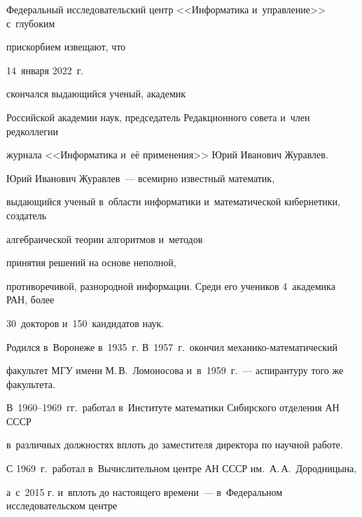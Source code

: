       


      Федеральный исследовательский центр <<Информатика и~управление>> с~глубоким


      прискорбием извещают, что     


      14~января 2022~г.\ %


      скончался выдающийся ученый, академик 


Российской академии наук, председатель Редакционного совета и~член редколлегии 


журнала <<Информатика и~её применения>> Юрий Иванович Журавлев.








      


      Юрий Иванович Журавлев~--- всемирно известный математик, 


выдающийся ученый в~области информатики и~математической кибернетики, создатель 


алгебраической теории алгоритмов и~методов


 принятия решений на основе неполной, 


противоречивой, разнородной информации. Среди его учеников 4~академика РАН, более 


30~докторов и~150~кандидатов наук. 








      


      Родился в~Воронеже в~1935~г. В~1957~г.\ окончил механико-математический 


факультет МГУ имени М.\,В.~Ломоносова и~в~1959~г.~--- аспирантуру того же факультета. 


В~1960--1969~гг.\ работал в~Институте математики Сибирского отделения АН \mbox{СССР} 


в~различных должностях вплоть до заместителя директора по научной работе. 








      


      С 1969~г.\ работал в~Вычислительном центре АН СССР им.\ А.\,А.~Дородницына, 


а~с~2015 г. и~вплоть до настоящего времени~--- в~Федеральном исследовательском центре 


